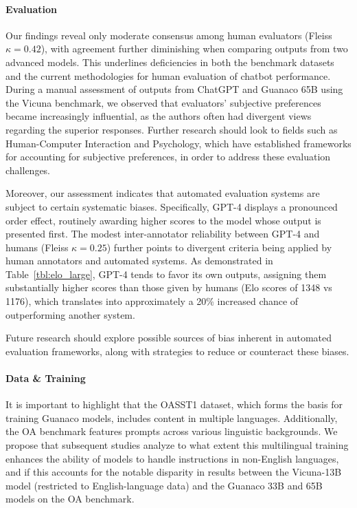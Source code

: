 \paragraph{Evaluation}

Our findings reveal only moderate consensus among human evaluators (Fleiss $\kappa=0.42$), with agreement further diminishing when comparing outputs from two advanced models. This underlines deficiencies in both the benchmark datasets and the current methodologies for human evaluation of chatbot performance. During a manual assessment of outputs from ChatGPT and {Guanaco} 65B using the Vicuna benchmark, we observed that evaluators' subjective preferences became increasingly influential, as the authors often had divergent views regarding the superior responses. Further research should look to fields such as Human-Computer Interaction and Psychology, which have established frameworks for accounting for subjective preferences, in order to address these evaluation challenges.

Moreover, our assessment indicates that automated evaluation systems are subject to certain systematic biases. Specifically, GPT-4 displays a pronounced order effect, routinely awarding higher scores to the model whose output is presented first. The modest inter-annotator reliability between GPT-4 and humans (Fleiss $\kappa=0.25$) further points to divergent criteria being applied by human annotators and automated systems. As demonstrated in Table~\ref{tbl:elo_large}, GPT-4 tends to favor its own outputs, assigning them substantially higher scores than those given by humans (Elo scores of 1348 vs 1176), which translates into approximately a 20\% increased chance of outperforming another system.

Future research should explore possible sources of bias inherent in automated evaluation frameworks, along with strategies to reduce or counteract these biases.

\paragraph{Data \& Training} It is important to highlight that the OASST1 dataset, which forms the basis for training {Guanaco} models, includes content in multiple languages. Additionally, the OA benchmark features prompts across various linguistic backgrounds. We propose that subsequent studies analyze to what extent this multilingual training enhances the ability of models to handle instructions in non-English languages, and if this accounts for the notable disparity in results between the Vicuna-13B model (restricted to English-language data) and the {Guanaco} 33B and 65B models on the OA benchmark.

